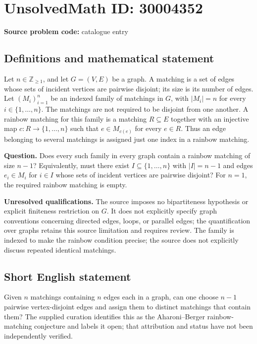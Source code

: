 \documentclass[11pt]{article}
\newcommand{\Z}{\mathbb{Z}}
\begin{document}
\section*{UnsolvedMath ID: 30004352}
\textbf{Source problem code:} catalogue entry
\subsection{Definitions and mathematical statement}
Let \(n\in\Z_{\geq 1}\), and let \(G=(V,E)\) be a graph. A matching is a set of edges whose sets of incident vertices are pairwise disjoint; its size is its number of edges. Let \((M_i)_{i=1}^{n}\) be an indexed family of matchings in \(G\), with \(|M_i|=n\) for every \(i\in\{1,\ldots,n\}\). The matchings are not required to be disjoint from one another. A rainbow matching for this family is a matching \(R\subseteq E\) together with an injective map \(c:R\to\{1,\ldots,n\}\) such that \(e\in M_{c(e)}\) for every \(e\in R\). Thus an edge belonging to several matchings is assigned just one index in a rainbow matching.

\textbf{Question.} Does every such family in every graph contain a rainbow matching of size \(n-1\)? Equivalently, must there exist \(I\subseteq\{1,\ldots,n\}\) with \(|I|=n-1\) and edges \(e_i\in M_i\) for \(i\in I\) whose sets of incident vertices are pairwise disjoint? For \(n=1\), the required rainbow matching is empty.

\textbf{Unresolved qualifications.} The source imposes no bipartiteness hypothesis or explicit finiteness restriction on \(G\). It does not explicitly specify graph conventions concerning directed edges, loops, or parallel edges; the quantification over graphs retains this source limitation and requires review. The family is indexed to make the rainbow condition precise; the source does not explicitly discuss repeated identical matchings.
\subsection{Short English statement}
Given \(n\) matchings containing \(n\) edges each in a graph, can one choose \(n-1\) pairwise vertex-disjoint edges and assign them to distinct matchings that contain them? The supplied curation identifies this as the Aharoni--Berger rainbow-matching conjecture and labels it open; that attribution and status have not been independently verified.
\end{document}
